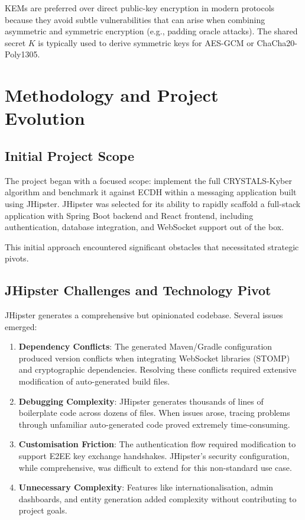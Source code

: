 \documentclass[11pt,a4paper]{article}
\begin{document}
KEMs are preferred over direct public-key encryption in modern protocols because they avoid subtle vulnerabilities that can arise when combining asymmetric and symmetric encryption (e.g., padding oracle attacks). The shared secret $K$ is typically used to derive symmetric keys for AES-GCM or ChaCha20-Poly1305.

\section{Methodology and Project Evolution}

\subsection{Initial Project Scope}

The project began with a focused scope: implement the full CRYSTALS-Kyber algorithm and benchmark it against ECDH within a messaging application built using JHipster. JHipster was selected for its ability to rapidly scaffold a full-stack application with Spring Boot backend and React frontend, including authentication, database integration, and WebSocket support out of the box.

This initial approach encountered significant obstacles that necessitated strategic pivots.

\subsection{JHipster Challenges and Technology Pivot}

JHipster generates a comprehensive but opinionated codebase. Several issues emerged:

\begin{enumerate}
    \item \textbf{Dependency Conflicts}: The generated Maven/Gradle configuration produced version conflicts when integrating WebSocket libraries (STOMP) and cryptographic dependencies. Resolving these conflicts required extensive modification of auto-generated build files.
    
    \item \textbf{Debugging Complexity}: JHipster generates thousands of lines of boilerplate code across dozens of files. When issues arose, tracing problems through unfamiliar auto-generated code proved extremely time-consuming.
    
    \item \textbf{Customisation Friction}: The authentication flow required modification to support E2EE key exchange handshakes. JHipster's security configuration, while comprehensive, was difficult to extend for this non-standard use case.
    
    \item \textbf{Unnecessary Complexity}: Features like internationalisation, admin dashboards, and entity generation added complexity without contributing to project goals.
\end{enumerate}
\end{document}

